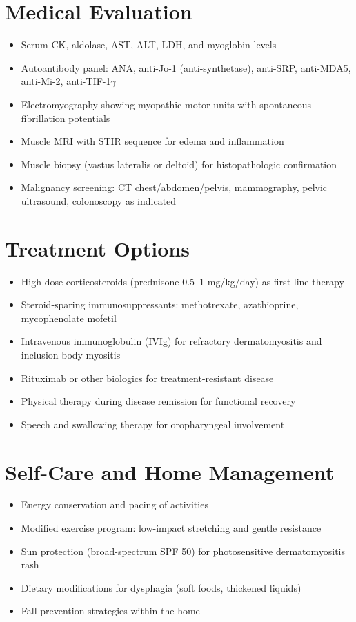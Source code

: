 \section*{Medical Evaluation}
\begin{itemize}
  \item Serum CK, aldolase, AST, ALT, LDH, and myoglobin levels
  \item Autoantibody panel: ANA, anti-Jo-1 (anti-synthetase), anti-SRP, anti-MDA5, anti-Mi-2, anti-TIF-1$\gamma$
  \item Electromyography showing myopathic motor units with spontaneous fibrillation potentials
  \item Muscle MRI with STIR sequence for edema and inflammation
  \item Muscle biopsy (vastus lateralis or deltoid) for histopathologic confirmation
  \item Malignancy screening: CT chest/abdomen/pelvis, mammography, pelvic ultrasound, colonoscopy as indicated
\end{itemize}

\section*{Treatment Options}
\begin{itemize}
  \item High-dose corticosteroids (prednisone 0.5--1 mg/kg/day) as first-line therapy
  \item Steroid-sparing immunosuppressants: methotrexate, azathioprine, mycophenolate mofetil
  \item Intravenous immunoglobulin (IVIg) for refractory dermatomyositis and inclusion body myositis
  \item Rituximab or other biologics for treatment-resistant disease
  \item Physical therapy during disease remission for functional recovery
  \item Speech and swallowing therapy for oropharyngeal involvement
\end{itemize}

\section*{Self-Care and Home Management}
\begin{itemize}
  \item Energy conservation and pacing of activities
  \item Modified exercise program: low-impact stretching and gentle resistance
  \item Sun protection (broad-spectrum SPF 50) for photosensitive dermatomyositis rash
  \item Dietary modifications for dysphagia (soft foods, thickened liquids)
  \item Fall prevention strategies within the home
\end{itemize}

